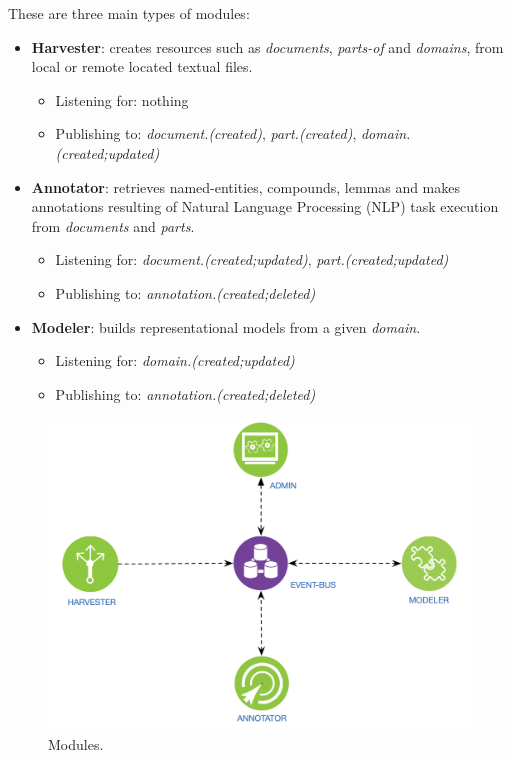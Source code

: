 These are three main types of modules:
\begin{itemize}
	\item \textbf{Harvester}: creates resources such as \textit{documents}, \textit{parts-of} and \textit{domains}, from local or remote located textual files.
    \begin{itemize}[rightmargin=\dimexpr\linewidth-5cm-\leftmargin\relax]
    		\item Listening for: nothing
		\item Publishing to: \textit{document.(created)}, \textit{part.(created)}, \textit{domain.(created;updated)}
    \end{itemize}
    \item \textbf{Annotator}: retrieves named-entities, compounds, lemmas and makes annotations resulting of Natural Language Processing (NLP) task execution from \textit{documents} and \textit{parts}.
    \begin{itemize}[rightmargin=\dimexpr\linewidth-5cm-\leftmargin\relax]
    	\item Listening for: \textit{document.(created;updated)}, \textit{part.(created;updated)}
		\item Publishing to: \textit{annotation.(created;deleted)}
    \end{itemize}
    \item \textbf{Modeler}: builds representational models from a given \textit{domain}. 
    \begin{itemize}[rightmargin=\dimexpr\linewidth-5cm-\leftmargin\relax]
    	\item Listening for: \textit{domain.(created;updated)}
		\item Publishing to: \textit{annotation.(created;deleted)}
    \end{itemize}
\end{itemize}

\begin{figure}
  \includegraphics[scale=0.25]{modules}
  \caption{Modules.}
  \label{fig:librairy-modules}
\end{figure}



